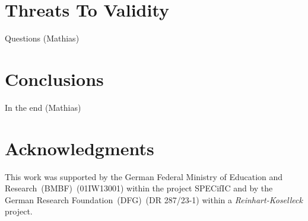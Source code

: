 \documentclass[conference]{IEEEtran}
\begin{document}
\section{Threats To Validity}
\label{sec:threats-validity}

\danger Questions (Mathias)

\section{Conclusions}
\label{sec:conclusions}

\danger In the end (Mathias)

\section*{Acknowledgments}
\label{sec:acknowledgments}
This work was supported by the German Federal Ministry of Education and
Research~(BMBF)~(01IW13001) within the project SPECifIC and by the German
Research Foundation~(DFG)~(DR 287/23-1) within a \emph{Reinhart-Koselleck}
project.


%
%
\end{document}
